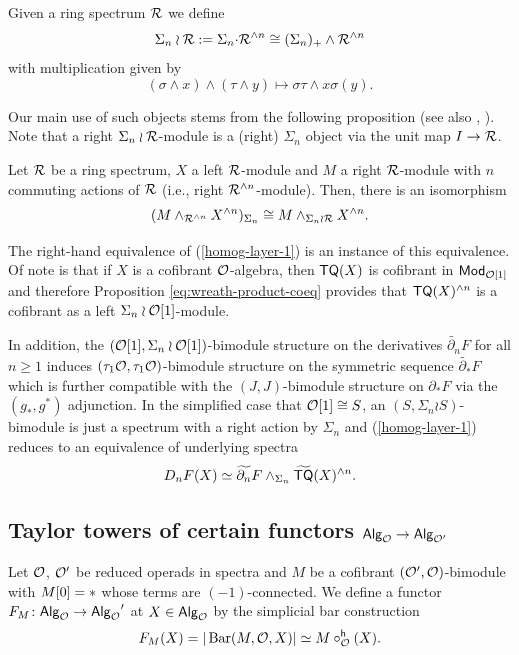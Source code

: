 \begin{definition} \label{rem:wreath-products}
    Given a ring spectrum $\mathcal{R}$ we define \[
        \Sigma_n \wr \mathcal{R}:= \Sigma_n {\cdot} \mathcal{R}^{\wedge n}\cong (\Sigma_n)_+\wedge \mathcal{R}^{\wedge n}\]
    with multiplication given by \[(\sigma \wedge x) \wedge (\tau \wedge y)\mapsto \sigma\tau \wedge x\sigma(y).\] 
\end{definition}

Our main use of such objects stems from the following proposition (see also \cite[Lemma 14]{Law-1}, \cite[]{KuhPer}). Note that a right $\Sigma_n \wr \mathcal{R}$-module is a (right) $\Sigma_n$ object via the unit map $I\to \mathcal{R}$. 

\begin{proposition} \label{eq:wreath-product-coeq}
    Let $\mathcal{R}$ be a ring spectrum, $X$ a left $\mathcal{R}$-module and $M$ a right $\mathcal{R}$-module with $n$ commuting actions of $\mathcal{R}$ (i.e., right $\mathcal{R}^{\wedge n}$-module). Then, there is an isomorphism \begin{equation*} 
        (M \wedge_{\mathcal{R}^{\wedge n}} X^{\wedge n})_{\Sigma_n}\cong M\wedge_{\Sigma_n \wr \mathcal{R}} X^{\wedge n}.
    \end{equation*}
\end{proposition}


\begin{remark}The right-hand equivalence of (\ref{homog-layer-1}) is an instance of this equivalence. Of note is that if $X$ is a cofibrant $\mathcal{O}$-algebra, then $\mathsf{TQ}(X)$ is cofibrant in $\mathsf{Mod}_{\mathcal{O}[1]}$ and therefore Proposition \ref{eq:wreath-product-coeq} provides that $\mathsf{TQ}(X)^{\wedge n}$ is a cofibrant as a left $\Sigma_n \wr \mathcal{O}[1]$-module. 
\end{remark}

In addition, the $(\mathcal{O}[1], \Sigma_n \wr \mathcal{O}[1])$-bimodule structure on the derivatives $\widetilde{\partial_n} F$ for all $n\geq 1$ induces $(\tau_1\mathcal{O}, \tau_1\mathcal{O})$-bimodule structure on the symmetric sequence $\widetilde{\partial_*} F$ which is further compatible with the $(J,J)$-bimodule structure on $\partial_*F$ via the $(g_*,g^*)$ adjunction. In the simplified case that $\mathcal{O}[1]\cong S$, an $(S,\Sigma_n \wr S)$-bimodule is just a spectrum with a right action by $\Sigma_n$ and (\ref{homog-layer-1}) reduces to an equivalence of underlying spectra \[D_n F(X)\simeq \widetilde{\partial_n}F\wedge_{\Sigma_n} \widetilde{\mathsf{TQ}}(X)^{\wedge n}.\]

\subsection{Taylor towers of certain functors ${\mathsf{Alg}_{\mathcal{O}}}\to {\mathsf{Alg}_{\mathcal{O'}}}$}
Let $\mathcal{O}$, $\mathcal{O}'$ be reduced operads in spectra and $M$ be a cofibrant $(\mathcal{O}', \mathcal{O})$-bimodule with $M[0]=*$ whose terms are $(-1)$-connected. We define a functor $F_M\colon {\mathsf{Alg}_{\mathcal{O}}}\to {\mathsf{Alg}_{\mathcal{O}}}'$ at $X\in {\mathsf{Alg}_{\mathcal{O}}}$ by the simplicial bar construction \begin{equation} 
    F_M(X) = |\operatorname{Bar}(M,\mathcal{O},X)| \simeq M \circ^{\mathsf{h}}_{\mathcal{O}}(X).\end{equation}

